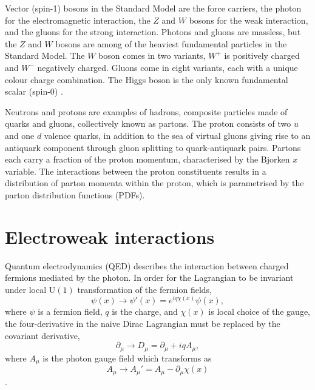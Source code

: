Vector (spin-1) bosons in the Standard Model are the force carriers, the photon for the
electromagnetic interaction, the $Z$ and $W$ bosons for the weak interaction,
and the gluons for the strong interaction. Photons and gluons are massless, but
the $Z$ and $W$ bosons are among of the heaviest fundamental particles in the
Standard Model. The $W$ boson comes in two variants, $W^+$ is positively charged
and $W^-$ negatively charged. Gluons come in eight variants, each with a unique
colour charge combination. The Higgs boson is the only known fundamental scalar
(spin-0) \cite{Thomson:2013zua}.

Neutrons and protons are examples of hadrons, composite particles made of quarks
and gluons, collectively known as partons. The proton consists of two $u$ and one
$d$ valence quarks, in addition to the sea of virtual gluons giving rise to an
antiquark component through gluon splitting to quark-antiquark pairs. Partons
each carry a fraction of the proton momentum, characterised by the Bjorken $x$
variable. The interactions between the proton constituents results in a
distribution of parton momenta within the proton, which is parametrised by the
parton distribution functions (PDFs).

\section{Electroweak interactions}

Quantum electrodynamics (QED) describes the interaction between charged fermions
mediated by the photon. In order for the Lagrangian to be invariant
under local $\text{U}(1)$ transformation of the fermion fields,
\begin{equation}
\psi(x) \rightarrow \psi'(x) = e^{iq\chi(x)}\psi(x),
\end{equation}
where $\psi$ is a fermion field, $q$ is the charge, and $\chi(x)$ is local choice of
the gauge, the four-derivative in the naive Dirac Lagrangian must be replaced by
the covariant derivative,
\begin{equation}
\partial_\mu \rightarrow D_\mu = \partial_\mu + i q A_\mu,
\end{equation}
where $A_\mu$ is the photon gauge field which transforms as
\begin{equation}
A_\mu \rightarrow A_\mu' = A_\mu - \partial_\mu \chi(x)
\end{equation}
\cite{Thomson:2013zua}.

